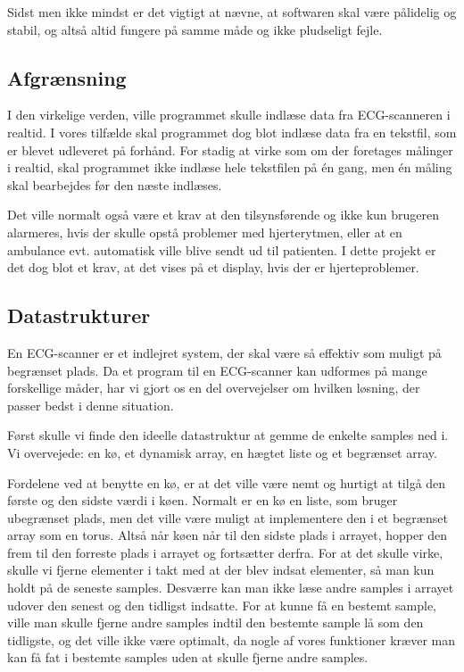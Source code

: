 \documentclass{article}
\begin{document}
Sidst men ikke mindst er det vigtigt at nævne, at softwaren skal være pålidelig og stabil, og altså altid fungere på samme måde og ikke pludseligt fejle.

\subsection{Afgrænsning}
I den virkelige verden, ville programmet skulle indlæse data fra ECG-scanneren i realtid. I vores tilfælde skal programmet dog blot indlæse data fra en tekstfil, som er blevet udleveret på forhånd. For stadig at virke som om der foretages målinger i realtid, skal programmet ikke indlæse hele tekstfilen på én gang, men én måling skal bearbejdes før den næste indlæses.

Det ville normalt også være et krav at den tilsynsførende og ikke kun brugeren alarmeres, hvis der skulle opstå problemer med hjerterytmen, eller at en ambulance evt. automatisk ville blive sendt ud til patienten. I dette projekt er det dog blot et krav, at det vises på et display, hvis der er hjerteproblemer.

\subsection{Datastrukturer}
En ECG-scanner er et indlejret system, der skal være så effektiv som muligt på begrænset plads. Da et program til en ECG-scanner kan udformes på mange forskellige måder, har vi gjort os en del overvejelser om hvilken løsning, der passer bedst i denne situation.

Først skulle vi finde den ideelle datastruktur at gemme de enkelte samples ned i. Vi overvejede: en kø, et dynamisk array, en hægtet liste og et begrænset array.

Fordelene ved at benytte en kø, er at det ville være nemt og hurtigt at tilgå den første og den sidste værdi i køen. Normalt er en kø en liste, som bruger ubegrænset plads, men det ville være muligt at implementere den i et begrænset array som en torus. Altså når køen når til den sidste plads i arrayet, hopper den frem til den forreste plads i arrayet og fortsætter derfra. For at det skulle virke, skulle vi fjerne elementer i takt med at der blev indsat elementer, så man kun holdt på de seneste samples. Desværre kan man ikke læse andre samples i arrayet udover den senest og den tidligst indsatte. For at kunne få en bestemt sample, ville man skulle fjerne andre samples indtil den bestemte sample lå som den tidligste, og det ville ikke være optimalt, da nogle af vores funktioner kræver man kan få fat i bestemte samples uden at skulle fjerne andre samples.
\end{document}
